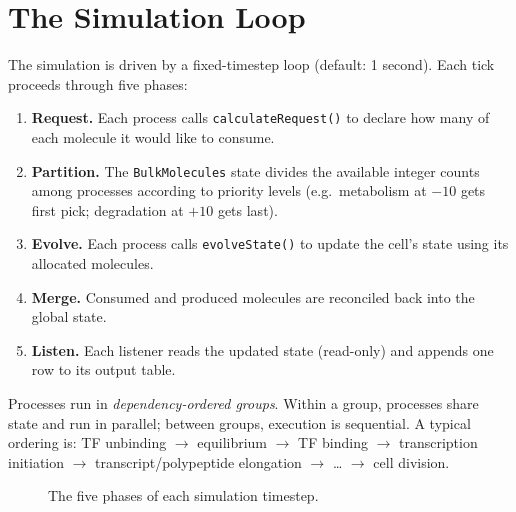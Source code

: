 \documentclass[11pt,a4paper]{article}
\begin{document}
\section{The Simulation Loop}
\label{sec:simloop}

The simulation is driven by a fixed-timestep loop (default: 1 second).  Each
tick proceeds through five phases:

\begin{enumerate}[nosep]
  \item \textbf{Request.}  Each process calls \texttt{calculateRequest()} to
    declare how many of each molecule it would like to consume.
  \item \textbf{Partition.}  The \texttt{BulkMolecules} state divides the
    available integer counts among processes according to priority levels
    (e.g.\ metabolism at $-10$ gets first pick; degradation at $+10$ gets
    last).
  \item \textbf{Evolve.}  Each process calls \texttt{evolveState()} to update
    the cell's state using its allocated molecules.
  \item \textbf{Merge.}  Consumed and produced molecules are reconciled back
    into the global state.
  \item \textbf{Listen.}  Each listener reads the updated state (read-only)
    and appends one row to its output table.
\end{enumerate}

Processes run in \emph{dependency-ordered groups}.  Within a group, processes
share state and run in parallel; between groups, execution is sequential.  A
typical ordering is: TF unbinding $\to$ equilibrium $\to$ TF binding $\to$
transcription initiation $\to$ transcript/polypeptide elongation $\to$ \ldots
$\to$ cell division.

\begin{figure}[H]
\centering
{}
\caption{The five phases of each simulation timestep.}
\label{fig:loop}
\end{figure}
\end{document}
